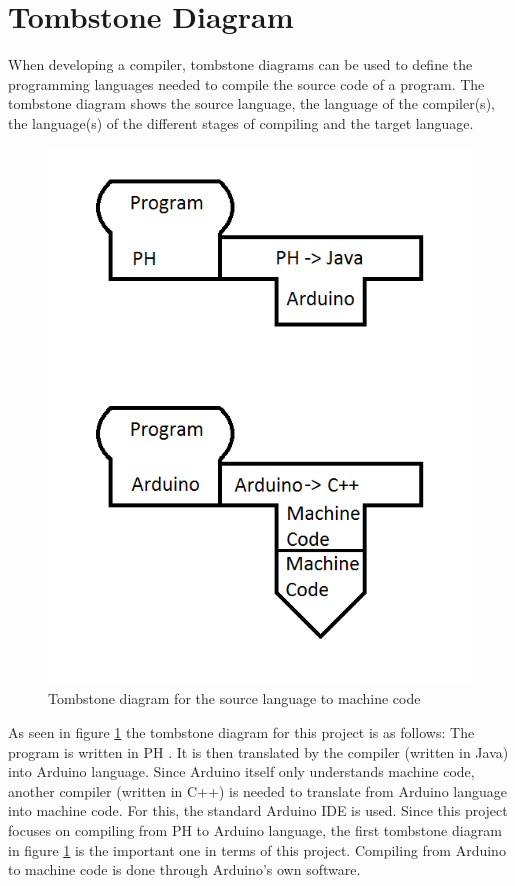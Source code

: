 \section{Tombstone Diagram}
When developing a compiler, tombstone diagrams can be used to define the programming languages needed to compile the source code of a program. The tombstone diagram shows the source language, the language of the compiler(s), the language(s) of the different stages of compiling and the target language.

\begin{figure}[H]
	\centering
		\includegraphics{billeder/tombstone_diagram.png}
		\caption{Tombstone diagram for the source language to machine code}
		\label{fig:tombstone}
\end{figure}

As seen in figure \ref{fig:tombstone} the tombstone diagram for this project is as follows: The program is written in PH . It is then translated by the compiler (written in Java) into Arduino language. Since Arduino itself only understands machine code, another compiler (written in C++) is needed to translate from Arduino language into machine code. For this, the standard Arduino IDE is used.
Since this project focuses on compiling from PH to Arduino language, the first tombstone diagram in figure \ref{fig:tombstone} is the important one in terms of this project. Compiling from Arduino to machine code is done through Arduino's own software.